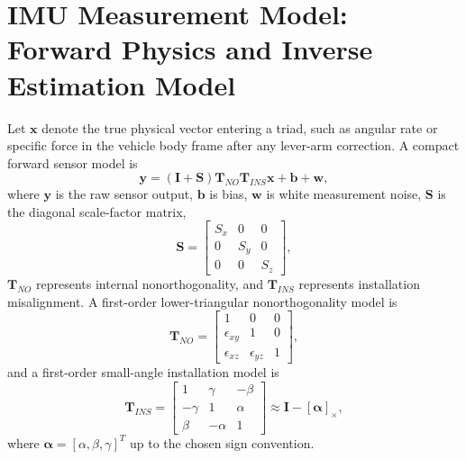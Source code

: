 \documentclass[11pt,oneside]{book}
\renewcommand{\skew}[1]{\left[#1\right]_{\times}}
\newcommand{\bb}{\mathbf{b}}
\newcommand{\I}{\mathbf{I}}
\begin{document}
\section{IMU Measurement Model: Forward Physics and Inverse Estimation Model}
Let $\mathbf{x}$ denote the true physical vector entering a triad, such as angular rate or specific force in the vehicle body frame after any lever-arm correction. A compact forward sensor model is
\begin{equation}
\mathbf{y}=\left(\I+\mathbf{S}\right)\mathbf{T}_{NO}\mathbf{T}_{INS}\mathbf{x}+\bb+\mathbf{w},
\label{eq:imu_forward_full_model}
\end{equation}
where $\mathbf{y}$ is the raw sensor output, $\bb$ is bias, $\mathbf{w}$ is white measurement noise, $\mathbf{S}$ is the diagonal scale-factor matrix,
\begin{equation}
\mathbf{S}=\begin{bmatrix}S_x&0&0\\0&S_y&0\\0&0&S_z\end{bmatrix},
\end{equation}
$\mathbf{T}_{NO}$ represents internal nonorthogonality, and $\mathbf{T}_{INS}$ represents installation misalignment. A first-order lower-triangular nonorthogonality model is
\begin{equation}
\mathbf{T}_{NO}=\begin{bmatrix}
1&0&0\\
\epsilon_{xy}&1&0\\
\epsilon_{xz}&\epsilon_{yz}&1
\end{bmatrix},
\end{equation}
and a first-order small-angle installation model is
\begin{equation}
\mathbf{T}_{INS}=\begin{bmatrix}
1&\gamma&-\beta\\
-\gamma&1&\alpha\\
\beta&-\alpha&1
\end{bmatrix}
\approx \I-\skew{\boldsymbol\alpha},
\end{equation}
where $\boldsymbol\alpha=[\alpha,\beta,\gamma]^T$ up to the chosen sign convention.
\end{document}
